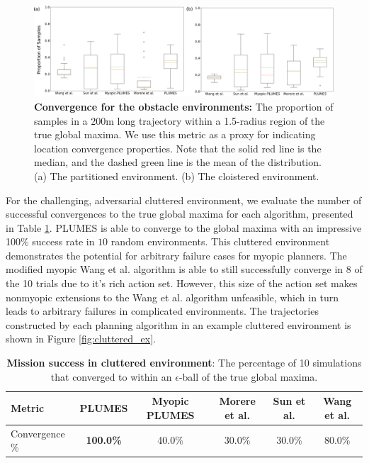 \documentclass{styles/svproc}
\begin{document}
\begin{figure}[t]
\centering
    \includegraphics[width=\linewidth]{figures/obstacle_props.png}
    \caption{\textbf{Convergence for the obstacle environments:} The proportion of samples in a 200m long trajectory within a 1.5-radius region of the true global maxima. We use this metric as a proxy for indicating location convergence properties. Note that the solid red line is the median, and the dashed green line is the mean of the distribution. (a) The partitioned environment. (b) The cloistered environment.}    
    \label{fig:obstacle_results}
\end{figure}


For the challenging, adversarial cluttered environment, we evaluate the number of successful convergences to the true global maxima for each algorithm, presented in Table \ref{tab:cluttered}. PLUMES is able to converge to the global maxima with an impressive 100\% success rate in $10$ random environments. This cluttered environment demonstrates the potential for arbitrary failure cases for myopic planners. The modified myopic Wang et al. algorithm is able to still successfully converge in 8 of the 10 trials due to it's rich action set. However, this size of the action set makes nonmyopic extensions to the Wang et al. algorithm unfeasible, which in turn leads to arbitrary failures in complicated environments. The trajectories constructed by each planning algorithm in an example cluttered environment is shown in Figure \ref{fig:cluttered_ex}.

\begin{table}[h]
\caption{\textbf{Mission success in cluttered environment}: The percentage of 10 simulations that converged to within an $\epsilon$-ball of the true global maxima.}
\label{tab:cluttered}
\begin{tabular}{l | c | c | c | c | c }
Metric & PLUMES & Myopic PLUMES & Morere et al. \cite{Marchant2014a} & Sun et al. \cite{Sun2017} & Wang et al. \cite{wang2017max}\\ [2pt] 
\hline 
\hline
Convergence \% & \textbf{100.0\% } & 40.0\% & 30.0\% & 30.0\% & 80.0\% \\
\hline
\end{tabular}
\end{table}
\end{document}
